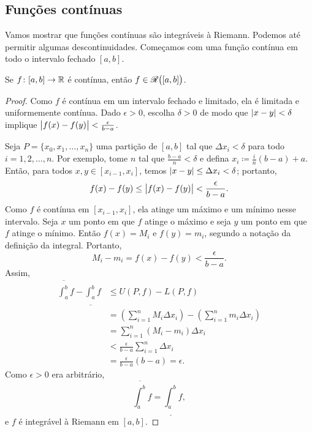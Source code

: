 \subsection{Funções contínuas}

Vamos mostrar que funções contínuas são integráveis à Riemann.
Podemos até permitir algumas descontinuidades. Começamos com uma
função contínua em todo o intervalo fechado $[a,b]$.

\begin{lemma} \label{lemma:contint}
Se $f \colon [a,b] \to {\mathbb{R}}$ é contínua,
então $f \in {\mathscr{R}}\bigl([a,b]\bigr)$.
\end{lemma}

\begin{proof}
Como $f$ é contínua em um intervalo fechado e limitado, ela é
limitada e
uniformemente contínua.
Dado $\epsilon > 0$, escolha $\delta > 0$ de modo que
$\lvert {x-y} \rvert < \delta$ implique $\bigl\lvert {f(x)-f(y)} \bigr\rvert < \frac{\epsilon}{b-a}$.

Seja $P = \{ x_0, x_1, \ldots, x_n \}$
uma partição de $[a,b]$ tal que $\Delta x_i < \delta$ para todo $i = 1,2,
\ldots, n$. Por exemplo,
tome $n$ tal que $\frac{b-a}{n} < \delta$ e
defina $x_i \coloneqq \frac{i}{n}(b-a) + a$.
Então, para todos $x, y \in [x_{i-1},x_i]$, temos
$\lvert {x-y} \rvert \leq \Delta x_i < \delta$; portanto,
\begin{equation*}
f(x)-f(y) \leq \bigl\lvert {f(x)-f(y)} \bigr\rvert < \frac{\epsilon}{b-a} .
\end{equation*}
Como $f$ é contínua em $[x_{i-1},x_i]$, ela atinge um máximo e um mínimo
nesse intervalo.
Seja $x$ um ponto em que $f$ atinge o máximo e seja $y$ um ponto
em que $f$ atinge o mínimo. Então $f(x) = M_i$
e $f(y) = m_i$, segundo a notação da definição da integral.
Portanto,
\begin{equation*}
M_i-m_i = f(x)-f(y) < 
\frac{\epsilon}{b-a} .
\end{equation*}
Assim,
\begin{equation*}
\begin{split}
\overline{\int_a^b} f - 
\underline{\int_a^b} f 
& \leq
U(P,f) - L(P,f)
\\
& =
\left(
\sum_{i=1}^n
M_i \Delta x_i
\right)
-
\left(
\sum_{i=1}^n
m_i \Delta x_i
\right)
\\
& =
\sum_{i=1}^n
(M_i-m_i) \Delta x_i
\\
& <
\frac{\epsilon}{b-a}
\sum_{i=1}^n
\Delta x_i
\\
& =
\frac{\epsilon}{b-a} (b-a)
= \epsilon .
\end{split}
\end{equation*}
Como $\epsilon > 0$ era arbitrário,
\begin{equation*}
\overline{\int_a^b} f = \underline{\int_a^b} f ,
\end{equation*}
e $f$ é integrável à Riemann em $[a,b]$.
\end{proof}

